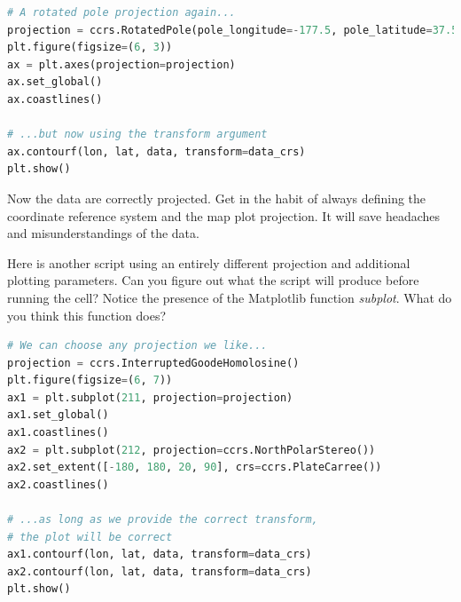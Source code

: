 \documentclass[a4paper , 12pt]{book}
\begin{document}
\begin{center}
\begin{lstlisting}[language=Python, frame=single]
# A rotated pole projection again...
projection = ccrs.RotatedPole(pole_longitude=-177.5, pole_latitude=37.5)
plt.figure(figsize=(6, 3))
ax = plt.axes(projection=projection)
ax.set_global()
ax.coastlines()

# ...but now using the transform argument
ax.contourf(lon, lat, data, transform=data_crs)
plt.show()
\end{lstlisting}
\end{center}

Now the data are correctly projected. Get in the habit of always defining the coordinate reference system and the map plot projection. It will save headaches and misunderstandings of the data.

Here is another script using an entirely different projection and additional plotting parameters. Can you figure out what the script will produce before running the cell? Notice the presence of the Matplotlib function \textit{subplot}. What do you think this function does?

\begin{center}
\begin{lstlisting}[language=Python, frame=single]
# We can choose any projection we like...
projection = ccrs.InterruptedGoodeHomolosine()
plt.figure(figsize=(6, 7))
ax1 = plt.subplot(211, projection=projection)
ax1.set_global()
ax1.coastlines()
ax2 = plt.subplot(212, projection=ccrs.NorthPolarStereo())
ax2.set_extent([-180, 180, 20, 90], crs=ccrs.PlateCarree())
ax2.coastlines()

# ...as long as we provide the correct transform, 
# the plot will be correct
ax1.contourf(lon, lat, data, transform=data_crs)
ax2.contourf(lon, lat, data, transform=data_crs)
plt.show()
\end{lstlisting}
\end{center}
\end{document}
